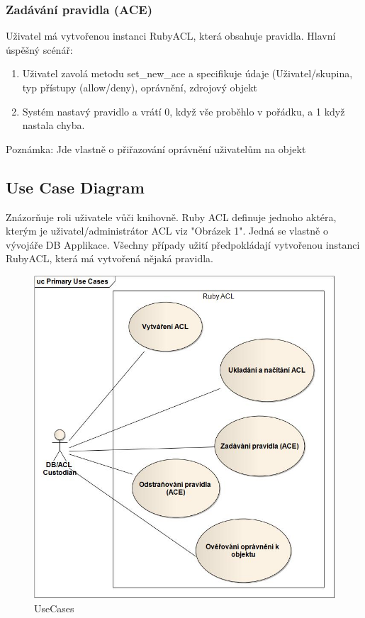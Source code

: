 \documentclass[11pt,twoside,a4paper]{book}
\begin{document}
\subsubsection{Zadávání pravidla (ACE)}
Uživatel má vytvořenou instanci RubyACL, která obsahuje pravidla.
Hlavní úspěšný scénář:
\begin{enumerate}
\item Uživatel zavolá metodu set\_new\_ace a specifikuje údaje (Uživatel/skupina, typ přístupy (allow/deny), oprávnění, zdrojový objekt
\item Systém nastavý pravidlo a vrátí 0, když vše proběhlo v pořádku, a 1 když nastala chyba.
\end{enumerate}
Poznámka: Jde vlastně o přiřazování oprávnění uživatelům na objekt




\subsection{Use Case Diagram}
Znázorňuje roli uživatele vůči knihovně. Ruby ACL definuje jednoho aktéra, kterým je uživatel/administrátor ACL viz "Obrázek 1". Jedná se vlastně o vývojáře DB Applikace.
Všechny případy užití předpokládají vytvořenou instanci RubyACL, která má vytvořená nějaká pravidla.
\begin{figure}
\includegraphics[width=15cm]{UseCases.jpg}
\caption{UseCases}
\label{fig:UseCases}
\end{figure}
\end{document}
